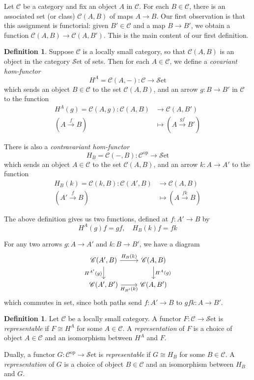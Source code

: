 \documentclass[10pt,oneside]{book}
\def\~#1{\mathscr{#1}}
\def\To#1{\xrightarrow{#1}}
\newcommand{\op}{\mathrm{op}}
\newcommand{\Set}{\~S\mathrm{et}}
\theoremstyle{plain}
\theoremstyle{definition}
\newtheorem{defn}[thm]{Definition}
\theoremstyle{remark}
\numberwithin{equation}{section}
\numberwithin{figure}{section}
\begin{document}
Let $\~C$ be a category and fix an object $A$ in $\~C$. For each $B \in \~C$, there is an associated set (or class) $\~C(A, B)$ of maps $A \to B$. Our first observation is that this assignment is functorial: given $B' \in \~C$ and a map $B \to B'$, we obtain a function $\~C(A, B) \to \~C(A, B')$. This is the main content of our first definition.

\begin{defn}
Suppose $\~C$ is a locally small category, so that $\~C(A, B)$ is an object in the category $\Set$ of sets. Then for each $A \in \~C$, we define a \emph{ covariant hom-functor}
    \[H^A = \~C(A, -): \~C \to \Set\]
    which sends an object $B \in \~C$ to the set $\~C(A,B)$, and an arrow $g: B \to B'$ in $\~C$ to the function
    \begin{align*}
    H^A(g) = \~C(A, g): \~C(A, B) &\to \~C(A, B')\\
                    (A \To{f} B) &\mapsto (A \To{gf} B')
    \end{align*}

    There is also a \emph{contravariant hom-functor}
    \[H_B = \~C(-, B): \~C^\op \to \Set\]
    which sends an object $A \in \~C$ to the set $\~C(A, B)$, and an arrow $k: A \to A'$ to the function
    \begin{align*}
        H_B(k) = \~C(k, B): \~C(A', B) &\to \~C(A, B)\\
                    (A' \To{f} B) &\mapsto (A \To{fk} B)
    \end{align*}
\end{defn}
The above definition gives us two functions, defined at $f: A' \to B$ by
    \[H^A (g) f = gf, \quad H_B(k)f = fk\]

    For any two arrows $g: A \to A'$ and $k: B \to B'$, we have a diagram
    \begin{equation}
    \label{eq:hom_square}
        \begin{tikzcd}
            {\~C(A',B)} & {\~C(A,B)} \\
            {\~C(A',B')} & {\~C(A,B')}
            \arrow["{H_B(k)}", from=1-1, to=1-2]
            \arrow["{H^{A'} (g) }"', from=1-1, to=2-1]
            \arrow["{H^A (g) }", from=1-2, to=2-2]
            \arrow["{H_{B'}(k)}"', from=2-1, to=2-2]
        \end{tikzcd}
    \end{equation}
    which commutes in set, since both paths send $f: A' \to B$ to $gfk: A \to B'$.


\begin{defn}
    Let $\~C$ be a locally small category. A functor $F: \~C \to \Set$ is \emph{representable} if $F \cong H^A$ for some $A \in \~C$. A \emph{representation} of $F$ is a choice of object $A \in \~C$ and an isomorphism between $H^A$ and $F$.

    Dually, a functor $G: \~C^\op \to \Set$ is \emph{representable} if $G \cong H_B$ for some $B \in \~C$. A \emph{representation} of $G$ is a choice of object $B \in \~C$ and an isomorphism between $H_B$ and $G$.
\end{defn}
\end{document}
